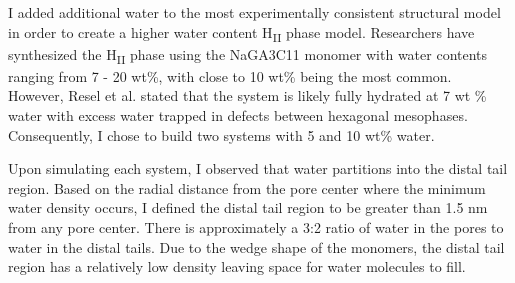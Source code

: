 \documentclass{article}
\begin{document}
  I added additional water to the most experimentally consistent structural
  model in order to create a higher water content H\textsubscript{II} phase
  model. Researchers have synthesized the H\textsubscript{II} phase using 
  the NaGA3C11 monomer with water contents ranging from 7 - 20 wt\%, with 
  close to 10 wt\% being the most common.~\cite{smith_ordered_1997,zhou_supported_2005} 
  However, Resel et al. stated that the system is likely fully hydrated at
  7 wt \% water with excess water trapped in defects between hexagonal
  mesophases.~\cite{resel_structural_2000} Consequently, I chose to build
  two systems with 5 and 10 wt\% water.
  
  Upon simulating each system, I observed that water partitions into the
  distal tail region. Based on the radial distance from the pore center where 
  the minimum water density occurs, I defined the distal tail region to 
  be greater than 1.5 nm from any pore center. There is approximately a 3:2
  ratio of water in the pores to water in the distal tails. Due to the wedge
  shape of the monomers, the distal tail region has a relatively low density
  leaving space for water molecules to fill.
  
\end{document}

